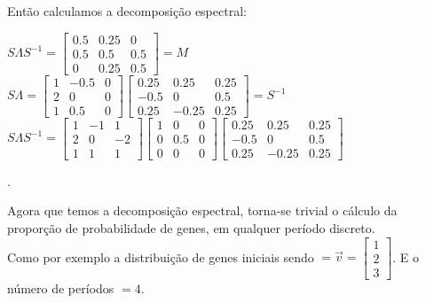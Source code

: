 \documentclass[14pt]{article}
\begin{document}
Então calculamos a decomposição espectral:

\begin{center}
    $S\Lambda S^{-1} = 
    \begin{bmatrix}
    0.5&0.25&0\\
    0.5&0.5&0.5\\
    0&0.25&0.5
    \end{bmatrix} = M $ \\
    $ $\\
    $ $\\
    
    $S \Lambda = \begin{bmatrix}
    1&-0.5&0\\
    2&0&0\\
    1&0.5&0
    \end{bmatrix} 
    \begin{bmatrix}
    0.25&0.25&0.25\\
    -0.5&0&0.5\\
    0.25&-0.25&0.25
    \end{bmatrix} = S^{-1}
    $\\
    $ $\\
    $ $\\
    $S\Lambda S^{-1} =
    \begin{bmatrix}
    1&-1&1\\
    2&0&-2\\
    1&1&1
    \end{bmatrix} 
    \begin{bmatrix}
    1&0&0\\
    0&0.5&0\\
    0&0&0
    \end{bmatrix}
    \begin{bmatrix}
    0.25&0.25&0.25\\
    -0.5&0&0.5\\
    0.25&-0.25&0.25
    \end{bmatrix}
    $
\end{center}.

Agora que temos a decomposição espectral, torna-se trivial o cálculo da proporção de probabilidade de genes, em qualquer período discreto.
$ $\\

Como por exemplo a distribuição de genes iniciais sendo $= \vec{v} = \begin{bmatrix} 1\\ 2\\ 3 \end{bmatrix}$. E o número de períodos $= 4$. \\
\end{document}
